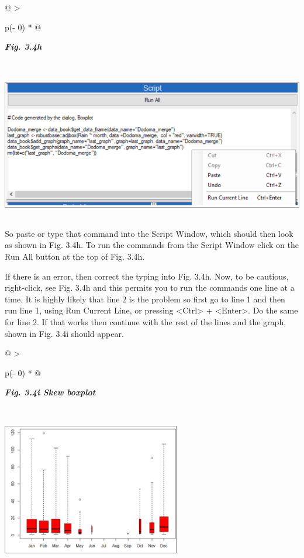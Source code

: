 \documentclass[
  letterpaper,
  DIV=11,
  numbers=noendperiod]{scrreprt}
\begin{document}
\begin{longtable}[]{@{}
  >{\raggedright\arraybackslash}p{(\columnwidth - 0\tabcolsep) * }@{}}
\toprule\noalign{}
\begin{minipage}[b]{\linewidth}\raggedright
\textbf{\emph{Fig. 3.4h}}
\end{minipage} \\
\midrule\noalign{}
\endhead
\bottomrule\noalign{}
\endlastfoot
\includegraphics[width=6.05943in,height=2.58261in]{figures/Fig3.4h.png} \\
\end{longtable}

So paste or type that command into the Script Window, which should then
look as shown in Fig. 3.4h. To run the commands from the Script Window
click on the Run All button at the top of Fig. 3.4h.

If there is an error, then correct the typing into Fig. 3.4h. Now, to be
cautious, right-click, see Fig. 3.4h and this permits you to run the
commands one line at a time. It is highly likely that line 2 is the
problem so first go to line 1 and then run line 1, using Run Current
Line, or pressing \textless Ctrl\textgreater{} +
\textless Enter\textgreater. Do the same for line 2. If that works then
continue with the rest of the lines and the graph, shown in Fig. 3.4i
should appear.

\begin{longtable}[]{@{}
  >{\raggedright\arraybackslash}p{(\columnwidth - 0\tabcolsep) * }@{}}
\toprule\noalign{}
\begin{minipage}[b]{\linewidth}\raggedright
\textbf{\emph{Fig. 3.4i Skew boxplot}}
\end{minipage} \\
\midrule\noalign{}
\endhead
\bottomrule\noalign{}
\endlastfoot
\includegraphics[width=3.06298in,height=2.5414in]{figures/Fig3.4i.png} \\
\end{longtable}
\end{document}
